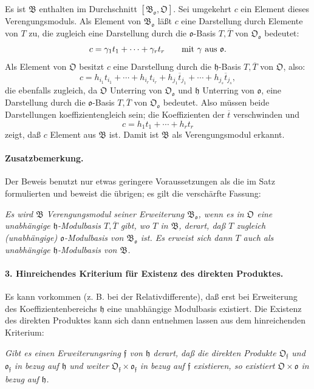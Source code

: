Es ist $\mathfrak B$ enthalten im Durchschnitt $[\mathfrak B_{\mathfrak o},\mathfrak O]$. Sei umgekehrt $c$ ein Element dieses Verengungsmoduls. Als Element von $\mathfrak B_{\mathfrak o}$ läßt $c$ eine Darstellung durch Elemente von $T$ zu, die zugleich eine Darstellung durch die $\mathfrak o$-Basis $T,\overline T$ von $\mathfrak O_{\mathfrak o}$ bedeutet:
\[
c=\gamma_1t_1+\cdots+\gamma_rt_r
\qquad\hbox{mit }\gamma\hbox{ aus }\mathfrak o.
\]
Als Element von $\mathfrak O$ besitzt $c$ eine Darstellung durch die $\mathfrak h$-Basis $T,\overline T$ von $\mathfrak O$, also:
\[
c=h_{i_1}t_{i_1}+\cdots+h_{i_r}t_{i_r}+h_{j_1}\overline t_{j_1}+\cdots+h_{j_s}\overline t_{j_s},
\]
die ebenfalls zugleich, da $\mathfrak O$ Unterring von $\mathfrak O_{\mathfrak o}$ und $\mathfrak h$ Unterring von $\mathfrak o$, eine Darstellung durch die $\mathfrak o$-Basis $T,\overline T$ von $\mathfrak O_{\mathfrak o}$ bedeutet. Also müssen beide Darstellungen koeffizientengleich sein; die Koeffizienten der $\overline t$ verschwinden und
\[
c=h_1t_1+\cdots+h_rt_r
\]
zeigt, daß $c$ Element aus $\mathfrak B$ ist. Damit ist $\mathfrak B$ als Verengungsmodul erkannt.

\paragraph{Zusatzbemerkung.}
Der Beweis benutzt nur etwas geringere Voraussetzungen als die im Satz formulierten und beweist die übrigen; es gilt die verschärfte Fassung:

\emph{Es wird $\mathfrak B$ Verengungsmodul seiner Erweiterung $\mathfrak B_{\mathfrak o}$, wenn es in $\mathfrak O$ eine unabhängige $\mathfrak h$-Modulbasis $T,\overline T$ gibt, wo $T$ in $\mathfrak B$, derart, daß $T$ zugleich (unabhängige) $\mathfrak o$-Modulbasis von $\mathfrak B_{\mathfrak o}$ ist. Es erweist sich dann $T$ auch als unabhängige $\mathfrak h$-Modulbasis von $\mathfrak B$.}

\paragraph{3. Hinreichendes Kriterium für Existenz des direkten Produktes.}
Es kann vorkommen (z. B. bei der Relativdifferente), daß erst bei Erweiterung des Koeffizientenbereichs $\mathfrak h$ eine unabhängige Modulbasis existiert. Die Existenz des direkten Produktes kann sich dann entnehmen lassen aus dem hinreichenden Kriterium:

\emph{Gibt es einen Erweiterungsring $\mathfrak f$ von $\mathfrak h$ derart, daß die direkten Produkte $\mathfrak O_{\mathfrak f}$ und $\mathfrak o_{\mathfrak f}$ in bezug auf $\mathfrak h$ und weiter $\mathfrak O_{\mathfrak f}\times\mathfrak o_{\mathfrak f}$ in bezug auf $\mathfrak f$ existieren, so existiert $\mathfrak O\times\mathfrak o$ in bezug auf $\mathfrak h$.}

